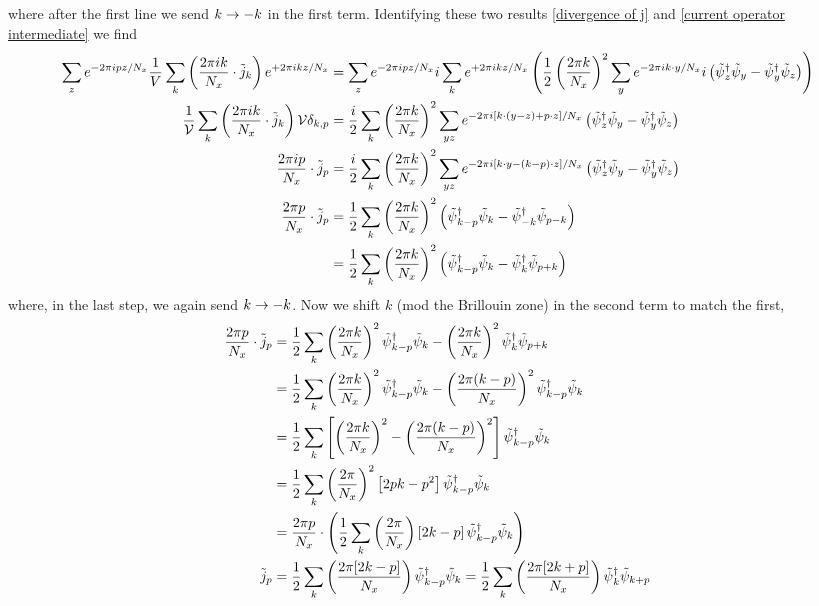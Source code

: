 where after the first line we send $k\rightarrow-k$ in the first term.
Identifying these two results \eqref{divergence of j} and \eqref{current operator intermediate} we find
\begin{align}
	\sum_{z} e^{-2\pi i p z / N_x} \frac{1}{V} \sum_k \left(\frac{2\pi i k}{N_x} \cdot \tilde{j}_k \right) e^{+2\pi i k z / N_x}
	&=
	\sum_{z} e^{-2\pi i p z / N_x} i\sum_k e^{+2\pi i k z / N_x} \left(
		\frac{1}{2} \left(\frac{2\pi k}{N_x}\right)^2 \sum_y e^{-2\pi i k \cdot y / N_x} i \left(\tilde{\psi}{}^{\dagger}_z \tilde{\psi}_y  - \tilde{\psi}{}^{\dagger}_y \tilde{\psi}_z \right)
	\right)
	\nonumber\\
	\frac{1}{\mathcal{V}} \sum_k \left( \frac{2\pi i k}{N_x} \cdot \tilde{j}_k \right) \mathcal{V} \delta_{k,p}
	&=
	\frac{i}{2}\sum_k
		\left(\frac{2\pi k}{N_x}\right)^2 \sum_{yz} e^{-2\pi i [k \cdot (y-z) + p \cdot z] / N_x} \left(\tilde{\psi}{}^{\dagger}_z \tilde{\psi}_y  - \tilde{\psi}{}^{\dagger}_y \tilde{\psi}_z \right)
	\nonumber\\
	\frac{2\pi i p}{N_x} \cdot \tilde{j}_p
	&=
	\frac{i}{2} \sum_k
		\left(\frac{2\pi k}{N_x}\right)^2 \sum_{yz} e^{-2\pi i [k \cdot y - (k-p) \cdot z] / N_x} \left(\tilde{\psi}{}^{\dagger}_z \tilde{\psi}_y  - \tilde{\psi}{}^{\dagger}_y \tilde{\psi}_z \right)
	\nonumber\\
	\frac{2\pi p}{N_x} \cdot \tilde{j}_p
	&=
	\frac{1}{2} \sum_k \left(\frac{2\pi k}{N_x}\right)^2 \left( \tilde{\psi}{}^{\dagger}_{k-p} \tilde{\psi}_k - \tilde{\psi}{}^{\dagger}_{-k} \tilde{\psi}_{p-k} \right)
	\nonumber\\
	&=
	\frac{1}{2} \sum_k \left(\frac{2\pi k}{N_x}\right)^2 \left( \tilde{\psi}{}^{\dagger}_{k-p} \tilde{\psi}_k - \tilde{\psi}{}^{\dagger}_{k} \tilde{\psi}_{p+k} \right)
\end{align}
where, in the last step, we again send $k\rightarrow-k$.
Now we shift $k$ (mod the Brillouin zone) in the second term to match the first,
\begin{align}
	\frac{2\pi p}{N_x} \cdot \tilde{j}_p
	&=
	\frac{1}{2} \sum_k \left(\frac{2\pi k}{N_x}\right)^2 \tilde{\psi}{}^{\dagger}_{k-p} \tilde{\psi}_k - \left(\frac{2\pi k}{N_x}\right)^2 \tilde{\psi}{}^{\dagger}_{k} \tilde{\psi}_{p+k}
	\nonumber\\
	&=
	\frac{1}{2} \sum_k \left(\frac{2\pi k}{N_x}\right)^2 \tilde{\psi}{}^{\dagger}_{k-p} \tilde{\psi}_k - \left(\frac{2\pi (k-p)}{N_x}\right)^2 \tilde{\psi}{}^{\dagger}_{k-p} \tilde{\psi}_{k}
	\nonumber\\
	&=
	\frac{1}{2} \sum_k \left[\left(\frac{2\pi k}{N_x}\right)^2 - \left(\frac{2\pi (k-p)}{N_x}\right)^2 \right] \tilde{\psi}{}^{\dagger}_{k-p} \tilde{\psi}_{k}
	\nonumber\\
	&=
	\frac{1}{2} \sum_k \left(\frac{2\pi}{N_x}\right)^2\left[ 2pk - p^2 \right] \tilde{\psi}{}^{\dagger}_{k-p} \tilde{\psi}_{k}
	\nonumber\\
	&=
	\frac{2\pi p}{N_x} \cdot \left(\frac{1}{2} \sum_k \left(\frac{2\pi}{N_x}\right)\left[ 2k - p \right] \tilde{\psi}{}^{\dagger}_{k-p} \tilde{\psi}_{k} \right)
	\nonumber\\
	\tilde{j}_p
	&=
	\frac{1}{2} \sum_k \left(\frac{2\pi [ 2k-p ]}{N_x}\right) \tilde{\psi}{}^{\dagger}_{k-p} \tilde{\psi}_{k}
	=
	\frac{1}{2} \sum_k \left(\frac{2\pi [ 2k+p ]}{N_x}\right) \tilde{\psi}{}^{\dagger}_{k} \tilde{\psi}_{k+p}
	\label{eq:current in momentum space}
\end{align}
